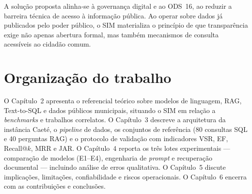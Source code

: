 A solução proposta alinha-se à governança digital e ao ODS~16, ao reduzir a barreira técnica de acesso à informação pública. Ao operar sobre dados já publicados pelo poder público, o SIM materializa o princípio de que transparência exige não apenas abertura formal, mas também mecanismos de consulta acessíveis ao cidadão comum.

\section{Organização do trabalho}

O Capítulo~2 apresenta o referencial teórico sobre modelos de linguagem, RAG, Text-to-SQL e dados públicos municipais, situando o SIM em relação a \textit{benchmarks} e trabalhos correlatos. O Capítulo~3 descreve a arquitetura da instância Caeté, o \textit{pipeline} de dados, os conjuntos de referência (80 consultas SQL e 40 perguntas RAG) e o protocolo de validação com indicadores VSR, EF, Recall@$k$, MRR e JAR. O Capítulo~4 reporta os três lotes experimentais --- comparação de modelos (E1--E4), engenharia de \textit{prompt} e recuperação documental --- incluindo análise de erros qualitativa. O Capítulo~5 discute implicações, limitações, confiabilidade e riscos operacionais. O Capítulo~6 encerra com as contribuições e conclusões.
